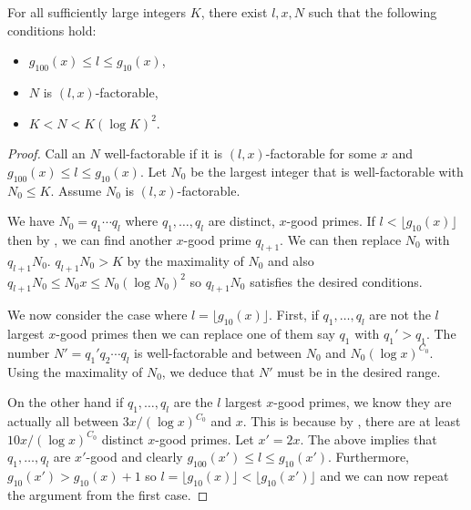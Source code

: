 \documentclass{toc}
\begin{document}
\begin{lemma}\label{scales}
For all sufficiently large integers $K$, there exist $l,x,N$ such that %
the following conditions hold:
\begin{itemize}
\item $g_{100}(x) \leq l \leq g_{10}(x)$,
\item $N$ is $(l,x)$-factorable,
\item$K < N < K (\log K)^2$.
\end{itemize}
%
%
\end{lemma}
\begin{proof}

Call an $N$ well-factorable if it is $(l,x)$-factorable for some $x$ and $g_{100}(x) \leq l \leq g_{10}(x)$.  Let $N_0$ be the largest integer that is well-factorable with $N_0 \leq K$.  %
Assume %
$N_0$ is $(l ,x)$-factorable.

We have $N_0 = q_1 \cdots q_l$ where $q_1, \dots , q_l$ are distinct, $x$-good primes.  If $l < \lfloor g_{10}(x) \rfloor$ then by , we can find another $x$-good prime $q_{l+1}$.  We can then replace $N_0$ with $q_{l+1}N_0$.  $q_{l+1}N_0 > K$ by the maximality of $N_0$ and also $q_{l+1}N_0 \leq N_0x \leq N_0 (\log N_0)^2$ so $q_{l+1}N_0$ satisfies the desired 
%
conditions. %

We now consider the case where $l = \lfloor g_{10}(x) \rfloor$.  First, if $q_1, \dots , q_l$ are not the $l$ largest $x$-good primes then we can replace one of them say $q_1$ with $q_1'>q_1$.  The number $N' = q_1'q_2 \cdots q_l$ is well-factorable and between $N_0$ and $N_0(\log x)^{C_0}$.  Using the maximality of $N_0$, we deduce that $N'$ must be in the desired range.  

On the other hand if $q_1, \dots , q_l$ are the $l$ largest $x$-good primes, we know they are actually all between $3x/(\log x)^{C_0}$ and $x$.  This is because by , there are at least $10x/(\log x)^{C_0}$ distinct $x$-good primes.  Let $x' = 2x$.  The above implies that $q_1, \dots , q_l$ are $x'$-good and clearly $g_{100}(x') \leq l \leq g_{10}(x')$.  Furthermore, $g_{10}(x') >g_{10}(x) + 1$ so $l = \lfloor g_{10}(x) \rfloor <  \lfloor g_{10}(x') \rfloor$ and we can now repeat the argument from the first case.
\end{proof}
\end{document}
